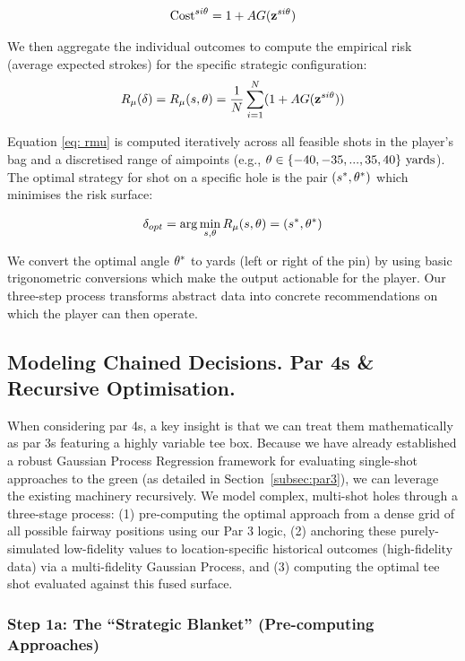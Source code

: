 \documentclass[11pt, letterpaper]{article}
\begin{document}
$$\text{Cost}^{si\theta} = 1 + AG(\mathbf{z}^{si\theta} )$$

We then aggregate the individual outcomes to compute the empirical risk (average expected strokes) for the specific strategic configuration:
\begin{align}
\label{eq: rmu}
    R_\mu(\delta) = R_\mu(s, \theta) = \frac{1}{N} \sum ^N_{i=1} (1+ AG(\mathbf{z}^{si\theta}))
\end{align}

Equation \eqref{eq: rmu} is computed iteratively across all feasible shots in the player's bag and a discretised range of aimpoints (e.g., $\theta \in \{-40, -35, ..., 35,  40 \}\text{ yards}$). The optimal strategy for shot on a specific hole is the pair $(s^*, \theta^*)$ which minimises the risk surface:

$$\delta_{opt} = \arg \min_{s, \theta} R_\mu(s, \theta) = (s^*, \theta^*)$$

We convert the optimal angle $\theta^*$ to yards (left or right of the pin) by using basic trigonometric conversions which make the output actionable for the player. Our three-step process transforms abstract data into concrete recommendations on which the player can then operate.

\subsection{Modeling Chained Decisions. Par 4s \& Recursive Optimisation.} 
\label{subsec: par4}

When considering par 4s, a key insight is that we can treat them mathematically as par 3s featuring a highly variable tee box. Because we have already established a robust Gaussian Process Regression framework for evaluating single-shot approaches to the green (as detailed in Section~\ref{subsec:par3}), we can leverage the existing machinery recursively. We model complex, multi-shot holes through a three-stage process:
(1) pre-computing the optimal approach from a dense grid of all possible fairway positions using our Par 3 logic, (2) anchoring these purely-simulated low-fidelity values to location-specific historical outcomes (high-fidelity data) via a multi-fidelity Gaussian Process, and (3) computing the optimal tee shot evaluated against this fused surface.

\subsubsection{Step 1a: The ``Strategic Blanket'' (Pre-computing Approaches)}
\label{subsec: strategicBlanket}
\end{document}
